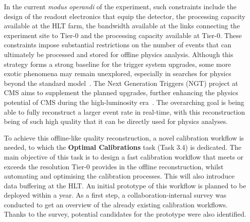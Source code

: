 In the current \textit{modus operandi} of the experiment, such constraints include the design of the readout electronics that equip the detector, the processing capacity available at the HLT farm, the bandwidth available at the links connecting the experiment site to Tier-0 and the processing capacity available at Tier-0. These constraints impose substantial restrictions on the number of events that can ultimately be processed and stored for offline physics analysis. Although this strategy forms a strong baseline for the trigger system upgrades, some more exotic phenomena may remain unexplored, especially in searches for physics beyond the standard model~\cite{cms_exotica_summary_plots}.
The Next Generation Triggers (NGT) project at CMS aims to supplement the planned upgrades, further enhancing the physics potential of CMS during the high-luminosity era~\cite{NGT_proposal}. The overarching goal is being able to fully reconstruct a larger event rate in real-time, with this reconstruction being of such high quality that it can be directly used for physics analyses.

To achieve this offline-like quality reconstruction, a novel calibration workflow is needed, to which the \textbf{Optimal Calibrations} task (Task 3.4) is dedicated. The main objective of this task is to design a fast calibration workflow that meets or exceeds the resolution Tier-0 provides in the offline reconstruction, whilst automating and optimising the calibration processes. This will also introduce data buffering at the HLT. An initial prototype of this workflow is planned to be deployed within a year. As a first step, a collaboration-internal survey was conducted to get an overview of the already existing calibration workflows. Thanks to the survey, potential candidates for the prototype were also identified.

